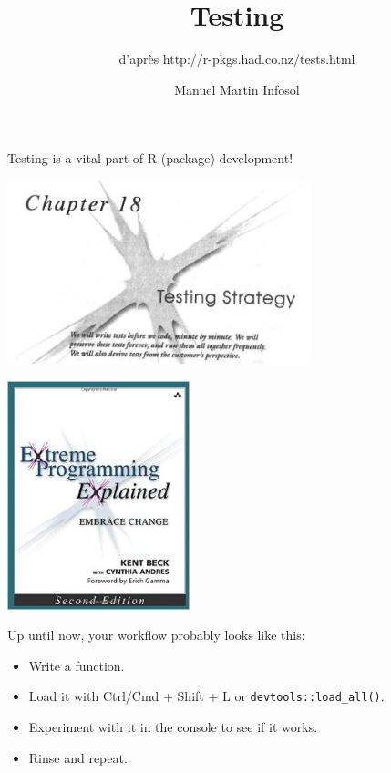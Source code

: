 \documentclass[12pt,handout]{beamer}
\author{Manuel Martin Infosol}
\title{Testing}
\subtitle{
d'après http://r-pkgs.had.co.nz/tests.html
}
\begin{document}
\begin{frame}[fragile]\titlepage
\end{frame}

\begin{frame}[fragile]

Testing is a vital part of R (package) development!
\begin{center}
\includegraphics[width = 250pt]{../images/XPTesting.png}
\end{center}
\end{frame}

\begin{frame}[fragile]
\begin{center}
\includegraphics[width = 150pt]{../images/XP.jpg}
\end{center}

\end{frame}

\begin{frame}[fragile]

Up until now, your workflow probably looks like this:

\begin{itemize}
\item Write a function.
\item Load it with Ctrl/Cmd + Shift + L or \texttt{devtools::load\_all()}.
\item Experiment with it in the console to see if it works.
\item Rinse and repeat.
\end{itemize}


\end{frame}
\end{document}
